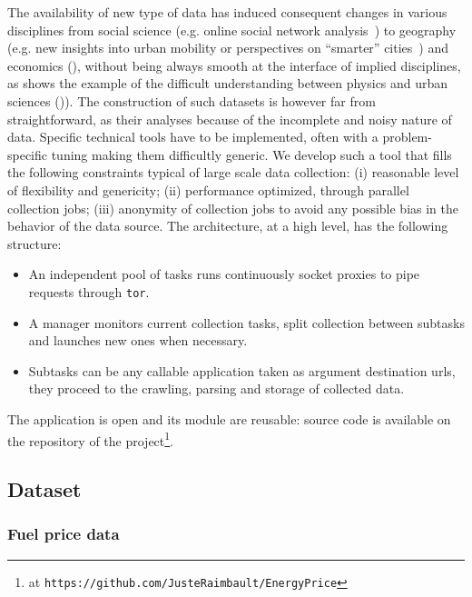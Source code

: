 \documentclass[3p,times,procedia]{elsarticle}
\begin{document}
The availability of new type of data has induced consequent changes in various disciplines from social science (e.g. online social network analysis~\cite{tan2013social}) to geography (e.g. new insights into urban mobility or perspectives on ``smarter'' cities~\cite{batty2013big}) and economics (), without being always smooth at the interface of implied disciplines, as shows the example of the difficult understanding between physics and urban sciences (\cite{dupuy2015sciences})). The construction of such datasets is however far from straightforward, as their analyses because of the incomplete and noisy nature of data. Specific technical tools have to be implemented, often with a problem-specific tuning making them difficultly generic. We develop such a tool that fills the following constraints typical of large scale data collection: (i) reasonable level of flexibility and genericity; (ii) performance optimized, through parallel collection jobs; (iii) anonymity of collection jobs to avoid any possible bias in the behavior of the data source. The architecture, at a high level, has the following structure:
\begin{itemize}
\item An independent pool of tasks runs continuously socket proxies to pipe requests through \texttt{tor}.
\item A manager monitors current collection tasks, split collection between subtasks and launches new ones when necessary.
\item Subtasks can be any callable application taken as argument destination urls, they proceed to the crawling, parsing and storage of collected data.
\end{itemize}
The application is open and its module are reusable: source code is available on the repository of the project\footnote{at \texttt{https://github.com/JusteRaimbault/EnergyPrice}}.




\subsection{Dataset}



\subsubsection{Fuel price data}
\end{document}
